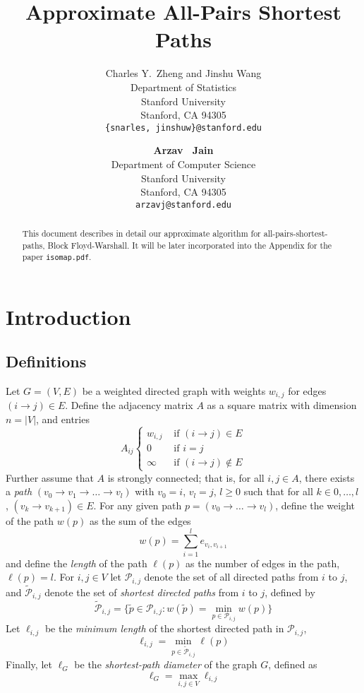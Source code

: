 \documentclass{article} %
\title{Approximate All-Pairs Shortest Paths}
\author{
Charles Y.~Zheng and Jinshu Wang\\
Department of Statistics\\
Stanford University\\
Stanford, CA 94305 \\
\texttt{\{snarles, jinshuw\}@stanford.edu} \\
\and
\textbf{Arzav ~Jain} \\
Department of Computer Science\\
Stanford University\\
Stanford, CA 94305 \\
\texttt{arzavj@stanford.edu} \\
}
\begin{document}
\maketitle

\begin{abstract}
  This document describes in detail our approximate algorithm for
  all-pairs-shortest-paths, Block Floyd-Warshall.  It will be later
  incorporated into the Appendix for the paper {\tt isomap.pdf}.
\end{abstract}

\section{Introduction}

\subsection{Definitions}

Let $G = (V, E)$ be a weighted directed graph with weights $w_{i,j}$ for edges $(i \to j) \in E$.
Define the adjacency matrix $A$ as a square matrix with dimension $n = |V|$, and entries
\[
A_{ij}
\begin{cases}
w_{i, j} &\text{ if } (i \to j) \in E\\
0 &\text{ if } i = j\\
\infty &\text{ if } (i \to j) \notin E
\end{cases}
\]
Further assume that $A$ is strongly connected; that is, for all $i, j
\in A$, there exists a \emph{path} $(v_0 \to v_1 \to \hdots \to v_l)$
with $v_0 = i$, $v_l = j$, $l \geq 0$ such that for all $k \in 0,
\hdots, l$, $(v_k \to v_{k+1}) \in E$.  For any given path $p = (v_0
\to \hdots \to v_l)$, define the weight of the path $w(p)$ as the sum
of the edges
\[
w(p) = \sum_{i=1}^l e_{v_i, v_{i+1}}
\]
and define the \emph{length} of the path $\ell(p)$ as the number of
edges in the path, $\ell(p) = l$.  For $i, j \in V$ let
$\mathcal{P}_{i,j}$ denote the set of all directed paths from $i$ to
$j$, and $\tilde{\mathcal{P}}_{i, j}$ denote the set of \emph{shortest
  directed paths} from $i$ to $j$, defined by
\[
\tilde{\mathcal{P}}_{i,j} = \{\tilde{p} \in \mathcal{P}_{i,j}: w(\tilde{p}) = \min_{p \in \mathcal{P}_{i,j}} w(p)\}
\]
Let $\ell_{i,j}$ be the \emph{minimum length} of the shortest directed
path in $\mathcal{P}_{i,j}$,
\[
\ell_{i,j} = \min_{p \in \tilde{\mathcal{P}}_{i,j}} \ell(p)
\]
Finally, let $\ell_G$ be the \emph{shortest-path diameter} of the graph $G$, defined as
\[
\ell_G = \max_{i, j \in V} \ell_{i, j}
\]
\end{document}
